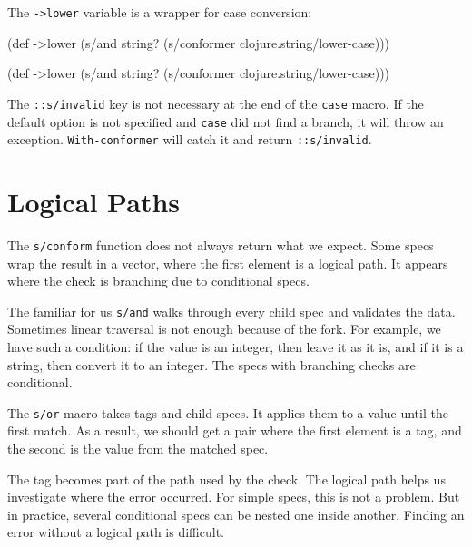 \fi

\noindent
The \verb|->lower| variable is a wrapper for case conversion:

\ifx\DEVICETYPE\MOBILE

\begin{english}
  \begin{clojure}
(def ->lower
  (s/and
    string?
    (s/conformer
      clojure.string/lower-case)))
  \end{clojure}
\end{english}
\else

\begin{english}
  \begin{clojure}
(def ->lower
  (s/and
    string?
    (s/conformer clojure.string/lower-case)))
  \end{clojure}
\end{english}

\fi

\mnoindent
The  \verb|::s/invalid| key is not necessary at the end of the \verb|case| macro. If the default option is not specified and \verb|case| did not find a branch, it will throw an exception. \verb|With-conformer| will catch it and return \verb|::s/invalid|.

\section{Logical Paths}


The \verb|s/conform| function does not always return what we expect. Some specs wrap the result in a vector, where the first element is a logical path. It appears where the check is branching due to conditional specs.

The familiar for us \verb|s/and| walks through every child spec and validates the data. Sometimes linear traversal is not enough because of the fork. For example, we have such a condition: if the value is an integer, then leave it as it is, and if it is a string, then convert it to an integer. The specs with branching checks are conditional.

The \verb|s/or| macro takes tags and child specs. It applies them to a value until the first match. As a result, we should get a pair where the first element is a tag, and the second is the value from the matched spec.

The tag becomes part of the path used by the check. The logical path helps us investigate where the error occurred. For simple specs, this is not a problem. But in practice, several conditional specs can be nested one inside another. Finding an error without a logical path is difficult.

